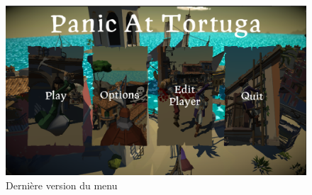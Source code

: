         \begin{figure}[hbt!]
            \centering
            \includegraphics[scale=0.35]{img/menu_principal.png}
            \caption{Dernière version du menu}
        \end{figure}
        \FloatBarrier
    